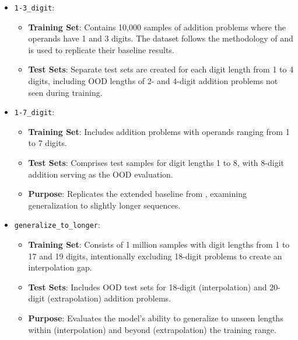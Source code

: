 \begin{itemize}
    \item \texttt{1-3\_digit}:
          \begin{itemize}
              \item \textbf{Training Set}: Contains 10,000 samples of addition problems where the operands have 1 and 3 digits. The dataset follows the methodology of \cite{lee_teaching_2023} and is used to replicate their baseline results.
              \item \textbf{Test Sets}: Separate test sets are created for each digit length from 1 to 4 digits, including OOD lengths of 2- and 4-digit addition problems not seen during training.
          \end{itemize}

    \item \texttt{1-7\_digit}:
          \begin{itemize}
              \item \textbf{Training Set}: Includes addition problems with operands ranging from 1 to 7 digits.
              \item \textbf{Test Sets}: Comprises test samples for digit lengths 1 to 8, with 8-digit addition serving as the OOD evaluation.
              \item \textbf{Purpose}: Replicates the extended baseline from \cite{lee_teaching_2023}, examining generalization to slightly longer sequences.
          \end{itemize}

    \item \texttt{generalize\_to\_longer}:
          \begin{itemize}
              \item \textbf{Training Set}: Consists of 1 million samples with digit lengths from 1 to 17 and 19 digits, intentionally excluding 18-digit problems to create an interpolation gap.
              \item \textbf{Test Sets}: Includes OOD test sets for 18-digit (interpolation) and 20-digit (extrapolation) addition problems.
              \item \textbf{Purpose}: Evaluates the model's ability to generalize to unseen lengths within (interpolation) and beyond (extrapolation) the training range.
          \end{itemize}


\end{itemize}
